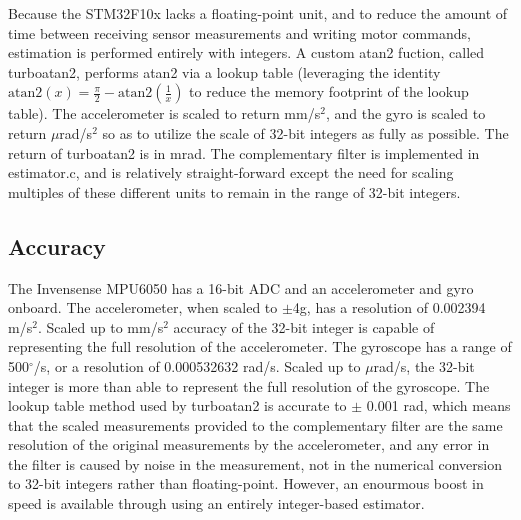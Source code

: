 \documentclass[paper=a4, fontsize=11pt]{scrartcl} %
\numberwithin{equation}{section} %
\numberwithin{figure}{section} %
\numberwithin{table}{section} %
\begin{document}
Because the STM32F10x lacks a floating-point unit, and to reduce the amount of time between receiving sensor measurements and writing motor commands, estimation is performed entirely with integers.  A custom atan2 fuction, called turboatan2, performs atan2 via a lookup table (leveraging the identity $\textrm{atan2}(x) = \tfrac{\pi}{2} - \textrm{atan2}\left(\tfrac{1}{x}\right)$ to reduce the memory footprint of the lookup table).  The accelerometer is scaled to return mm/s$^2$, and the gyro is scaled to return $\mu$rad/s$^2$ so as to utilize the scale of 32-bit integers as fully as possible.  The return of turboatan2 is in mrad.  The complementary filter is implemented in estimator.c, and is relatively straight-forward except the need for scaling multiples of these different units to remain in the range of 32-bit integers.

\subsection{Accuracy}

The Invensense MPU6050 has a 16-bit ADC and an accelerometer and gyro onboard.  The accelerometer, when scaled to $\pm$4g, has a resolution of 0.002394 m/s$^2$.  Scaled up to mm/s$^2$ accuracy of the 32-bit integer is capable of representing the full resolution of the accelerometer.  The gyroscope has a range of 500$^\circ$/s, or a resolution of 0.000532632 rad/s.  Scaled up to $\mu$rad/s, the 32-bit integer is more than able to represent the full resolution of the gyroscope.  The lookup table method used by turboatan2 is accurate to $\pm$ 0.001 rad, which means that the scaled measurements provided to the complementary filter are the same resolution of the original measurements by the accelerometer, and any error in the filter is caused by noise in the measurement, not in the numerical conversion to 32-bit integers rather than floating-point.  However, an enourmous boost in speed is available through using an entirely integer-based estimator.
\end{document}
